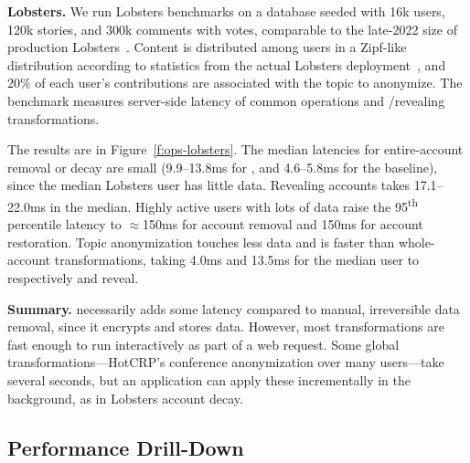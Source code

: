 \textbf{Lobsters.}
%
We run Lobsters benchmarks on a database seeded with 16k users, 
120k stories, and 300k comments with votes, comparable to the late-2022 size of
production Lobsters~\cite{lobsters}.
%
Content is distributed among users in a Zipf-like distribution according to
statistics from the actual Lobsters deployment~\cite{lobsters-data}, and 20\% of
each user's contributions are associated with the topic to anonymize.
%
The benchmark measures server-side latency of common operations and
\xxing/revealing transformations.
%
%
%
%

%
The results are in Figure~\ref{f:ops-lobsters}.
%
The median latencies for entire-account removal or decay are small (9.9--13.8ms
for \sys, and 4.6--5.8ms for the baseline), since the median Lobsters user has
little data. Revealing \xxed accounts takes 17.1--22.0ms in the median.
%
Highly active users with lots of data raise the 95\textsuperscript{th}
percentile latency to $\approx$150ms for account removal and 150ms for account
restoration.
%
Topic anonymization touches less data and is faster than whole-account
transformations, taking 4.0ms and 13.5ms for the median user to respectively \xx
and reveal.
%

\textbf{Summary.}
%
\sys necessarily adds some latency compared to manual, irreversible data
removal, since it encrypts and stores \xxed data.
%
However, most \xxing transformations are fast enough to run interactively as
part of a web request.
%
Some global \xxing transformations---\eg HotCRP's conference anonymization over
many users---take several seconds, but an application can apply these
incrementally in the background, as in Lobsters account decay.
%

\subsection{\sys Performance Drill-Down}
\label{s:eval-additional}

